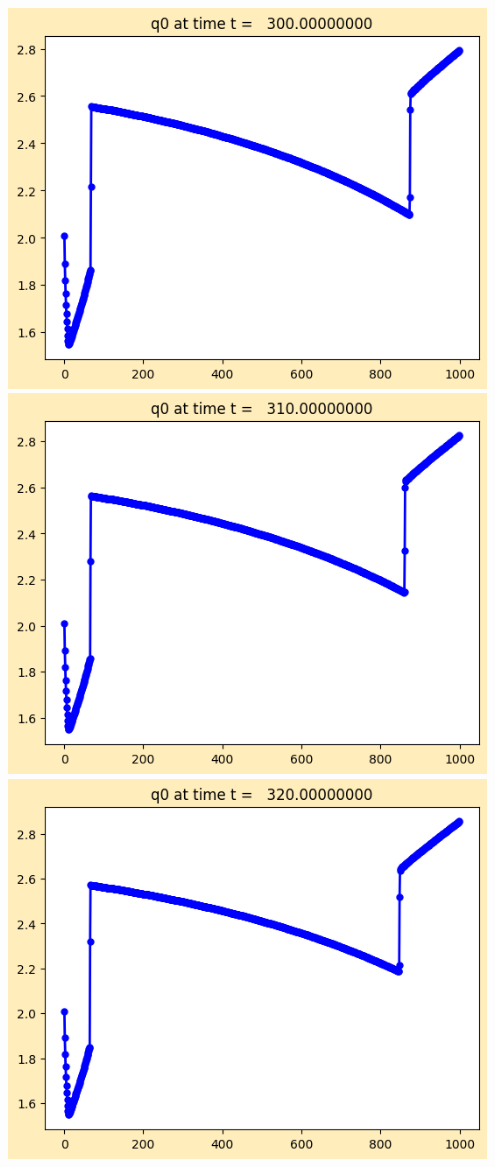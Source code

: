 \documentclass[11pt]{article}
\begin{document}
\vskip 10pt 
\includegraphics[width=0.95\textwidth]{frame0030fig1.png}
\vskip 10pt 
\includegraphics[width=0.95\textwidth]{frame0031fig1.png}
\vskip 10pt 
\includegraphics[width=0.95\textwidth]{frame0032fig1.png}
\end{document}
